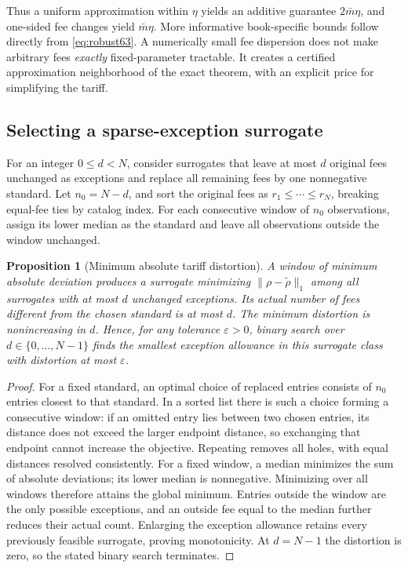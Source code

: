 \documentclass[11pt,letterpaper]{article}
\newtheorem{proposition}[theorem]{Proposition}
\theoremstyle{definition}\newtheorem{remark}[theorem]{Remark}
\begin{document}
Thus a uniform approximation within $\eta$ yields an additive guarantee $2\bar m\eta$, and one-sided fee changes yield $\bar m\eta$. More informative book-specific bounds follow directly from \eqref{eq:robust63}. A numerically small fee dispersion does not make arbitrary fees \emph{exactly} fixed-parameter tractable. It creates a certified approximation neighborhood of the exact theorem, with an explicit price for simplifying the tariff.

\subsection{Selecting a sparse-exception surrogate}
For an integer $0\leq d<N$, consider surrogates that leave at most $d$ original fees unchanged as exceptions and replace all remaining fees by one nonnegative standard. Let $n_0=N-d$, and sort the original fees as $r_1\leq\cdots\leq r_N$, breaking equal-fee ties by catalog index. For each consecutive window of $n_0$ observations, assign its lower median as the standard and leave all observations outside the window unchanged.
\begin{proposition}[Minimum absolute tariff distortion]\label{prop:projection63}
A window of minimum absolute deviation produces a surrogate minimizing $\|\rho-\widetilde\rho\|_1$ among all surrogates with at most $d$ unchanged exceptions. Its actual number of fees different from the chosen standard is at most $d$. The minimum distortion is nonincreasing in $d$. Hence, for any tolerance $\varepsilon>0$, binary search over $d\in\{0,\ldots,N-1\}$ finds the smallest exception allowance in this surrogate class with distortion at most $\varepsilon$.
\end{proposition}
\begin{proof}
For a fixed standard, an optimal choice of replaced entries consists of $n_0$ entries closest to that standard. In a sorted list there is such a choice forming a consecutive window: if an omitted entry lies between two chosen entries, its distance does not exceed the larger endpoint distance, so exchanging that endpoint cannot increase the objective. Repeating removes all holes, with equal distances resolved consistently. For a fixed window, a median minimizes the sum of absolute deviations; its lower median is nonnegative. Minimizing over all windows therefore attains the global minimum. Entries outside the window are the only possible exceptions, and an outside fee equal to the median further reduces their actual count. Enlarging the exception allowance retains every previously feasible surrogate, proving monotonicity. At $d=N-1$ the distortion is zero, so the stated binary search terminates.
\end{proof}
\end{document}
